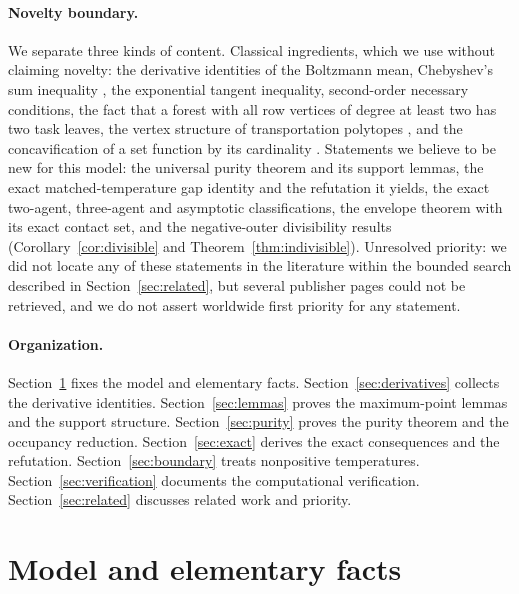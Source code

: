 \documentclass[11pt]{article}
\theoremstyle{plain}
\theoremstyle{definition}
\theoremstyle{remark}
\begin{document}
\paragraph{Novelty boundary.} We separate three kinds of content. Classical ingredients, which we use without claiming novelty: the derivative identities of the Boltzmann mean, Chebyshev's sum inequality \cite{HLP}, the exponential tangent inequality, second-order necessary conditions, the fact that a forest with all row vertices of degree at least two has two task leaves, the vertex structure of transportation polytopes \cite{Bolker1972,DeLoeraKim}, and the concavification of a set function by its cardinality \cite{Shioura2009}. Statements we believe to be new for this model: the universal purity theorem and its support lemmas, the exact matched-temperature gap identity and the refutation it yields, the exact two-agent, three-agent and asymptotic classifications, the envelope theorem with its exact contact set, and the negative-outer divisibility results (Corollary~\ref{cor:divisible} and Theorem~\ref{thm:indivisible}). Unresolved priority: we did not locate any of these statements in the literature within the bounded search described in Section~\ref{sec:related}, but several publisher pages could not be retrieved, and we do not assert worldwide first priority for any statement.

\paragraph{Organization.} Section~\ref{sec:model} fixes the model and elementary facts. Section~\ref{sec:derivatives} collects the derivative identities. Section~\ref{sec:lemmas} proves the maximum-point lemmas and the support structure. Section~\ref{sec:purity} proves the purity theorem and the occupancy reduction. Section~\ref{sec:exact} derives the exact consequences and the refutation. Section~\ref{sec:boundary} treats nonpositive temperatures. Section~\ref{sec:verification} documents the computational verification. Section~\ref{sec:related} discusses related work and priority.

\section{Model and elementary facts}\label{sec:model}
\end{document}
